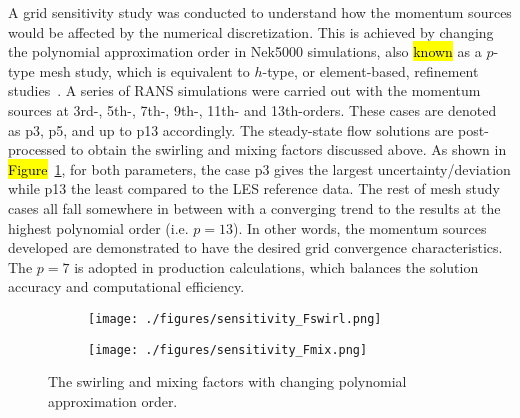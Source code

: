 A grid sensitivity study was conducted to understand how the momentum sources would be affected by the numerical discretization. This is achieved by changing the polynomial approximation order in Nek5000 simulations, also \hl{known} as a $p$-type mesh study, which is equivalent to $h$-type, or element-based, refinement studies~\citep{Shaver2019}. 
A series of RANS simulations were carried out with the momentum sources at 3rd-, 5th-, 7th-, 9th-, 11th- and 13th-orders. These cases are denoted as p3, p5, and up to p13 accordingly. The steady-state flow solutions are post-processed to obtain the swirling and mixing factors discussed above. 
As shown in \hl{Figure}~\ref{fig:sensitivity}, for both parameters, the case p3 gives the largest uncertainty/deviation while p13 the least compared to the LES reference data. The rest of mesh study cases all fall somewhere in between with a converging trend to the results at the highest polynomial order (i.e. $p=13$).
In other words, the momentum sources developed are demonstrated to have the desired grid convergence characteristics. 
The $p=7$ is adopted in production calculations, which balances the solution accuracy and computational efficiency. 

\begin{figure}
\centering
\begin{subfigure}{.5\textwidth}
  \centering
  \texttt{[image: ./figures/sensitivity\_Fswirl.png]}
\end{subfigure}%
\begin{subfigure}{.5\textwidth}
  \centering
  \texttt{[image: ./figures/sensitivity\_Fmix.png]}
\end{subfigure}
\caption{The swirling and mixing factors with changing polynomial approximation order.}
\label{fig:sensitivity}
\end{figure}
